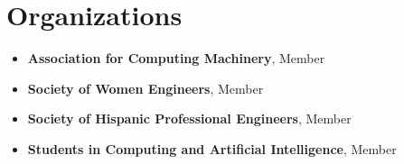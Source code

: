 \documentclass[letterpaper,11pt]{article}
\newcommand{\resumeItem}[1]{
  \item\small{
    {#1 \vspace{-2pt}}
  }
}
\newcommand{\resumeSubHeadingListStart}{\begin{itemize}[leftmargin=0.15in, label={}]}
\newcommand{\resumeSubHeadingListEnd}{\end{itemize}}
\begin{document}
\section{Organizations}

\resumeSubHeadingListStart
    \resumeItem{\textbf{Association for Computing Machinery}, Member}
    \resumeItem{\textbf{Society of Women Engineers}, Member}
    \resumeItem{\textbf{Society of Hispanic Professional Engineers}, Member}
    \resumeItem{\textbf{Students in Computing and Artificial Intelligence}, Member}
\resumeSubHeadingListEnd


\end{document}
